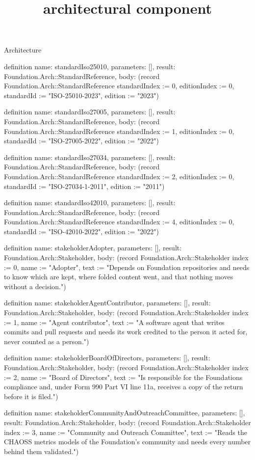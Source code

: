 \begin{lexlean}{Architecture}
\title{architectural component}
\begin{semanticmodule}
definition{
  name: standardIso25010,
  parameters: [],
  result: Foundation.Arch::StandardReference,
  body: (record Foundation.Arch::StandardReference {standardIndex := 0, editionIndex := 0, standardId := "ISO-25010-2023", edition := "2023"})
}

definition{
  name: standardIso27005,
  parameters: [],
  result: Foundation.Arch::StandardReference,
  body: (record Foundation.Arch::StandardReference {standardIndex := 1, editionIndex := 0, standardId := "ISO-27005-2022", edition := "2022"})
}

definition{
  name: standardIso27034,
  parameters: [],
  result: Foundation.Arch::StandardReference,
  body: (record Foundation.Arch::StandardReference {standardIndex := 2, editionIndex := 0, standardId := "ISO-27034-1-2011", edition := "2011"})
}

definition{
  name: standardIso42010,
  parameters: [],
  result: Foundation.Arch::StandardReference,
  body: (record Foundation.Arch::StandardReference {standardIndex := 4, editionIndex := 0, standardId := "ISO-42010-2022", edition := "2022"})
}

definition{
  name: stakeholderAdopter,
  parameters: [],
  result: Foundation.Arch::Stakeholder,
  body: (record Foundation.Arch::Stakeholder {index := 0, name := "Adopter", text := "Depends on Foundation repositories and needs to know which are kept, where folded content went, and that nothing moves without a decision."})
}

definition{
  name: stakeholderAgentContributor,
  parameters: [],
  result: Foundation.Arch::Stakeholder,
  body: (record Foundation.Arch::Stakeholder {index := 1, name := "Agent contributor", text := "A software agent that writes commits and pull requests and needs its work credited to the person it acted for, never counted as a person."})
}

definition{
  name: stakeholderBoardOfDirectors,
  parameters: [],
  result: Foundation.Arch::Stakeholder,
  body: (record Foundation.Arch::Stakeholder {index := 2, name := "Board of Directors", text := "Is responsible for the Foundations compliance and, under Form 990 Part VI line 11a, receives a copy of the return before it is filed."})
}

definition{
  name: stakeholderCommunityAndOutreachCommittee,
  parameters: [],
  result: Foundation.Arch::Stakeholder,
  body: (record Foundation.Arch::Stakeholder {index := 3, name := "Community and Outreach Committee", text := "Reads the CHAOSS metrics models of the Foundation's community and needs every number behind them validated."})
}


\end{semanticmodule}
\end{lexlean}
